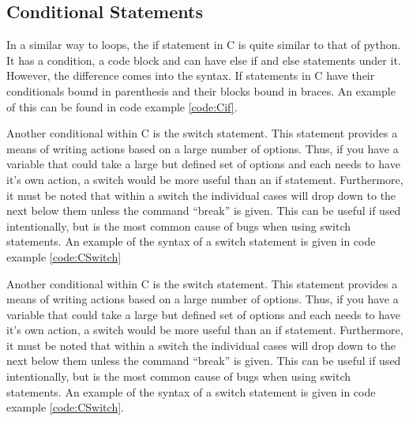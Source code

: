 \documentclass[a4paper,11pt]{report}
\begin{document}
			\begin{code}
				C}]{./CLoops.c}
				\caption{Examples of Basic C Loops}
				\label{code:CLoops}
			\end{code}
		\subsection{Conditional Statements}
			In a similar way to loops, the if statement in C is quite similar to that of python. 
			It has a condition, a code block and can have else if and else statements under it. 
			However, the difference comes into the syntax. 
			If statements in C have their conditionals bound in parenthesis and their blocks bound in braces. 
			An example of this can be found in code example \ref{code:Cif}.

			\begin{code}
				C}]{./if.c}
				\caption{Example of the C if statement}
				\label{code:Cif}
			\end{code}

			Another conditional within C is the switch statement. 
			This statement provides a means of writing actions based on a large number of options. 
			Thus, if you have a variable that could take a large but defined set of options and each needs to have it's own action, a switch would be more useful than an if statement. 
			Furthermore, it must be noted that within a switch the individual cases will drop down to the next below them unless the command ``break'' is given. 
			This can be useful if used intentionally, but is the most common cause of bugs when using switch statements. 
			An example of the syntax of a switch statement is given in code example \ref{code:CSwitch}

			Another conditional within C is the switch statement. 
			This statement provides a means of writing actions based on a large number of options. 
			Thus, if you have a variable that could take a large but defined set of options and each needs to have it's own action, a switch would be more useful than an if statement. 
			Furthermore, it must be noted that within a switch the individual cases will drop down to the next below them unless the command ``break'' is given. 
			This can be useful if used intentionally, but is the most common cause of bugs when using switch statements. 
			An example of the syntax of a switch statement is given in code example \ref{code:CSwitch}.

			\begin{code}
				C}]{./CSwitch.c}
				\caption{Example of the C Switch Statement}
				\label{code:CSwitch}
			\end{code}
\end{document}
